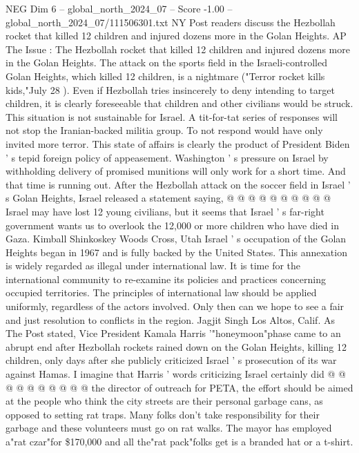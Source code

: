 \begin{textsample}{NEG Dim 6 – global\_north\_2024\_07 – Score -1.00 – global\_north\_2024\_07/111506301.txt}  \label{ex:f6_neg_226}
NY Post readers discuss the Hezbollah rocket that killed 12 children and injured dozens more in the Golan Heights.
AP The Issue : The Hezbollah rocket that killed 12 children and injured dozens more in the Golan Heights.
The attack on the sports field in the Israeli-controlled Golan Heights, which killed 12 children, is a nightmare ("Terror rocket kills kids,"July 28 ).
Even if Hezbollah tries insincerely to deny intending to target children, it is clearly foreseeable that children and other civilians would be struck.
This situation is not sustainable for Israel.
A tit-for-tat series of responses will not stop the Iranian-backed militia group.
To not respond would have only invited more terror.
This state of affairs is clearly the product of President Biden ' s tepid foreign policy of appeasement.
Washington ' s pressure on Israel by withholding delivery of promised munitions will only work for a short time.
And that time is running out.
After the Hezbollah attack on the soccer field in Israel ' s Golan Heights, Israel released a statement saying, @ @ @ @ @ @ @ @ @ @ Israel may have lost 12 young civilians, but it seems that Israel ' s far-right government wants us to overlook the 12,000 or more children who have died in Gaza.
Kimball Shinkoskey Woods Cross, Utah Israel ' s occupation of the Golan Heights began in 1967 and is fully backed by the United States.
This annexation is widely regarded as illegal under international law.
It is time for the international community to re-examine its policies and practices concerning occupied territories.
The principles of international law should be applied uniformly, regardless of the actors involved.
Only then can we hope to see a fair and just resolution to conflicts in the region.
Jagjit Singh Los Altos, Calif.
As The Post stated, Vice President Kamala Harris '"honeymoon"phase came to an abrupt end after Hezbollah rockets rained down on the Golan Heights, killing 12 children, only days after she publicly criticized Israel ' s prosecution of its war against Hamas.
I imagine that Harris ' words criticizing Israel certainly did @ @ @ @ @ @ @ @ @ @ the director of outreach for PETA, the effort should be aimed at the people who think the city streets are their personal garbage cans, as opposed to setting rat traps.
Many folks don't take responsibility for their garbage and these volunteers must go on rat walks.
The mayor has employed a"rat czar"for \$170,000 and all the"rat pack"folks get is a branded hat or a t-shirt.

\end{textsample}
